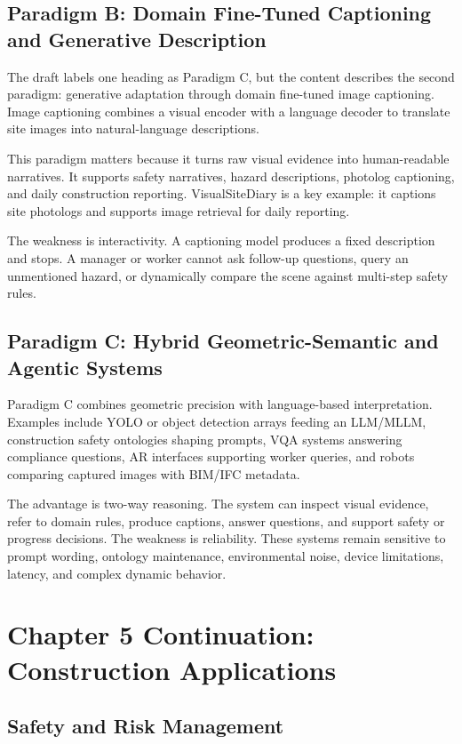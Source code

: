 \documentclass[10pt,letterpaper]{article}
\begin{document}
\subsection{Paradigm B: Domain Fine-Tuned Captioning and Generative Description}

The draft labels one heading as Paradigm C, but the content describes the second paradigm: generative adaptation through domain fine-tuned image captioning. Image captioning combines a visual encoder with a language decoder to translate site images into natural-language descriptions.

This paradigm matters because it turns raw visual evidence into human-readable narratives. It supports safety narratives, hazard descriptions, photolog captioning, and daily construction reporting. VisualSiteDiary is a key example: it captions site photologs and supports image retrieval for daily reporting.

The weakness is interactivity. A captioning model produces a fixed description and stops. A manager or worker cannot ask follow-up questions, query an unmentioned hazard, or dynamically compare the scene against multi-step safety rules.

\subsection{Paradigm C: Hybrid Geometric-Semantic and Agentic Systems}

Paradigm C combines geometric precision with language-based interpretation. Examples include YOLO or object detection arrays feeding an LLM/MLLM, construction safety ontologies shaping prompts, VQA systems answering compliance questions, AR interfaces supporting worker queries, and robots comparing captured images with BIM/IFC metadata.

The advantage is two-way reasoning. The system can inspect visual evidence, refer to domain rules, produce captions, answer questions, and support safety or progress decisions. The weakness is reliability. These systems remain sensitive to prompt wording, ontology maintenance, environmental noise, device limitations, latency, and complex dynamic behavior.

\section{Chapter 5 Continuation: Construction Applications}

\subsection{Safety and Risk Management}
\end{document}
